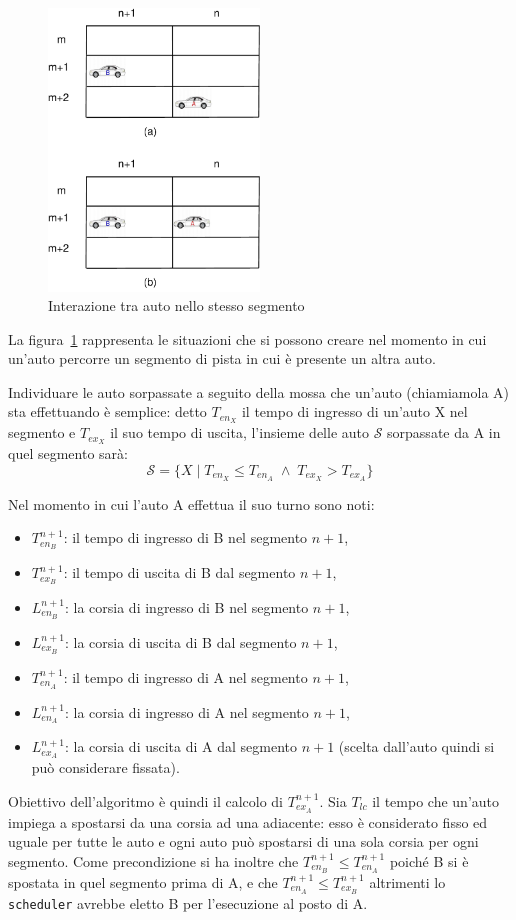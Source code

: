 \documentclass[a4paper]{report}
\begin{document}
\begin{figure}
\begin{center}
\includegraphics[width=0.5\textwidth]{diagrammi/Surpass}
\caption{Interazione tra auto nello stesso segmento}
\label{fig:surpass}
\end{center}
\end{figure}
La figura~\ref{fig:surpass} rappresenta le situazioni che si possono creare nel momento in cui un'auto percorre un segmento di pista in cui è presente un altra auto.

Individuare le auto sorpassate a seguito della mossa che un'auto (chiamiamola A) sta effettuando è semplice: detto $T_{en_X}$ il tempo di ingresso di un'auto X nel segmento e $T_{ex_X}$ il suo tempo di uscita, l'insieme delle auto $\mathcal{S}$ sorpassate da A in quel segmento sarà:
\[ \mathcal{S} = \{ X \mid T_{en_X} \leq T_{en_A} \;\wedge\; T_{ex_X} > T_{ex_A}\} \]

Nel momento in cui l'auto A effettua il suo turno sono noti:
\begin{itemize}
\item $T_{en_B}^{n+1}$: il tempo di ingresso di B nel segmento $n+1$,
\item $T_{ex_B}^{n+1}$: il tempo di uscita di B dal segmento $n+1$,
\item $L_{en_B}^{n+1}$: la corsia di ingresso di B nel segmento $n+1$,
\item $L_{ex_B}^{n+1}$: la corsia di uscita di B dal segmento $n+1$,
\item $T_{en_A}^{n+1}$: il tempo di ingresso di A nel segmento $n+1$,
\item $L_{en_A}^{n+1}$: la corsia di ingresso di A nel segmento $n+1$,
\item $L_{ex_A}^{n+1}$: la corsia di uscita di A dal segmento $n+1$ (scelta dall'auto quindi si può considerare fissata).
\end{itemize}
Obiettivo dell'algoritmo è quindi il calcolo di $T_{ex_A}^{n+1}$. Sia $T_{lc}$ il tempo che un'auto impiega a spostarsi da una corsia ad una adiacente: esso è considerato fisso ed uguale per tutte le auto e ogni auto può spostarsi di una sola corsia per ogni segmento.
Come precondizione si ha inoltre che $T_{en_B}^{n+1} \leq T_{en_A}^{n+1}$ poiché B si è spostata in quel segmento prima di A, e che $T_{en_A}^{n+1} \leq T_{ex_B}^{n+1}$ altrimenti lo \texttt{scheduler} avrebbe eletto B per l'esecuzione al posto di A.
\end{document}
